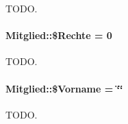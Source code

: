 TODO. 

\hypertarget{classMitglied_adadc54a72a46a089ddec43855ba3c7e}{
\paragraph[\$Rechte]{\setlength{\rightskip}{0pt plus 5cm}Mitglied::\$Rechte = 0}\hfill}
\label{classMitglied_adadc54a72a46a089ddec43855ba3c7e}


TODO. 

\hypertarget{classMitglied_157424daca1ecda5b6f6a3e0f24ecfce}{
\paragraph[\$Vorname]{\setlength{\rightskip}{0pt plus 5cm}Mitglied::\$Vorname = \char`\"{}\char`\"{}}\hfill}
\label{classMitglied_157424daca1ecda5b6f6a3e0f24ecfce}


TODO. 

